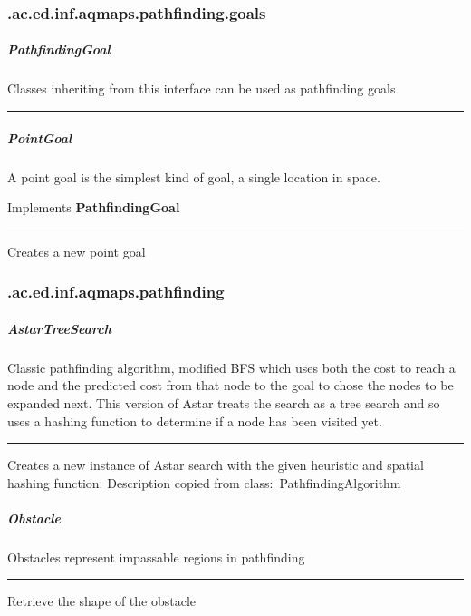 \subsubsection{ .ac.ed.inf.aqmaps.pathfinding.goals }
\subparagraph{ PathfindingGoal } Classes inheriting from this interface can be used as pathfinding goals
 
\hrule
\begin{mitem}
\scriptsize
	{}
\end{mitem}

\subparagraph{ PointGoal } A point goal is the simplest kind of goal, a single location in space.
 
Implements \textbf{ PathfindingGoal }
\hrule
\begin{mitem}
\scriptsize
	{Creates a new point goal}
	{}
\end{mitem}

\subsubsection{ .ac.ed.inf.aqmaps.pathfinding }
\subparagraph{ AstarTreeSearch } Classic pathfinding algorithm, modified BFS which uses both the cost to reach a node and the predicted cost from that node to the goal
 to chose the nodes to be expanded next. This version of Astar treats the search as a tree search and so uses a hashing function to determine if a node has been visited yet.
 
\hrule
\begin{mitem}
\scriptsize
	{Creates a new instance of Astar search with the given heuristic and spatial hashing function.}
	{Description copied from class:~PathfindingAlgorithm}
\end{mitem}

\subparagraph{ Obstacle } Obstacles represent impassable regions in pathfinding
 
\hrule
\begin{mitem}
\scriptsize
	{Retrieve the shape of the obstacle}
\end{mitem}

